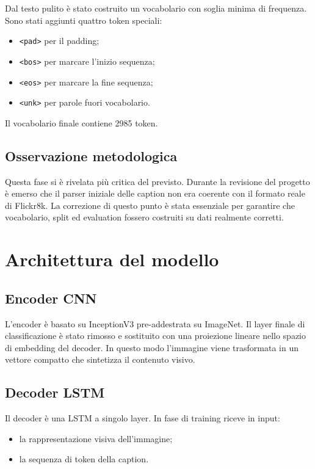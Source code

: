 \documentclass[12pt,a4paper]{article}
\begin{document}
Dal testo pulito è stato costruito un vocabolario con soglia minima di frequenza. Sono stati aggiunti quattro token speciali:
\begin{itemize}[leftmargin=*]
    \item \texttt{<pad>} per il padding;
    \item \texttt{<bos>} per marcare l'inizio sequenza;
    \item \texttt{<eos>} per marcare la fine sequenza;
    \item \texttt{<unk>} per parole fuori vocabolario.
\end{itemize}

Il vocabolario finale contiene 2985 token.

\subsection{Osservazione metodologica}

Questa fase si è rivelata più critica del previsto. Durante la revisione del progetto è emerso che il parser iniziale delle caption non era coerente con il formato reale di Flickr8k. La correzione di questo punto è stata essenziale per garantire che vocabolario, split ed evaluation fossero costruiti su dati realmente corretti.

\section{Architettura del modello}

\subsection{Encoder CNN}

L'encoder è basato su InceptionV3 pre-addestrata su ImageNet. Il layer finale di classificazione è stato rimosso e sostituito con una proiezione lineare nello spazio di embedding del decoder. In questo modo l'immagine viene trasformata in un vettore compatto che sintetizza il contenuto visivo.

\subsection{Decoder LSTM}

Il decoder è una LSTM a singolo layer. In fase di training riceve in input:
\begin{itemize}[leftmargin=*]
    \item la rappresentazione visiva dell'immagine;
    \item la sequenza di token della caption.
\end{itemize}
\end{document}

